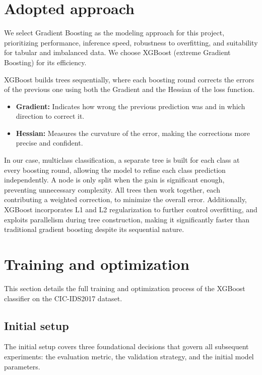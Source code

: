 \section{Adopted approach}

We select Gradient Boosting as the modeling approach for this project, prioritizing performance, inference speed, robustness to overfitting, and suitability for tabular and imbalanced data. We choose XGBoost (extreme Gradient Boosting) for its efficiency.

XGBoost builds trees sequentially, where each boosting round corrects the errors of the previous one using both the Gradient and the Hessian of the loss function.

\begin{itemize}
    \item \textbf{Gradient:} Indicates how wrong the previous prediction was and in which direction to correct it.
    \item \textbf{Hessian:} Measures the curvature of the error, making the corrections more precise and confident.
\end{itemize}

In our case, multiclass classification, a separate tree is built for each class at every boosting round, allowing the model to refine each class prediction independently. A node is only split when the gain is significant enough, preventing unnecessary complexity. All trees then work together, each contributing a weighted correction, to minimize the overall error. Additionally, XGBoost incorporates L1 and L2 regularization to further control overfitting, and exploits parallelism during tree construction, making it significantly faster than traditional gradient boosting despite its sequential nature.


\section{Training and optimization}

This section details the full training and optimization process of the XGBoost classifier on the CIC-IDS2017 dataset.

\subsection{Initial setup}

The initial setup covers three foundational decisions that govern all subsequent experiments: the evaluation metric, the validation strategy, and the initial model parameters.

